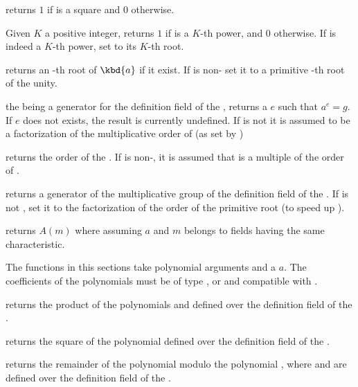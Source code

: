  returns $1$ if  is a square and $0$
otherwise.

 Given $K$ a positive integer,
returns $1$ if  is a $K$-th power, and $0$ otherwise. If  is
indeed a $K$-th power, set  to its $K$-th root.

 returns an -th root of
$\kbd{a}$ if it exist. If  is non- set it to a primitive
-th root of the unity.

 the   being a
generator for the definition field of the  , returns a
 $e$ such that $a^e=g$.  If $e$ does not exists, the result is
currently undefined. If  is not  it is assumed to be a
factorization of the multiplicative order of  (as set by
)

 returns the order of the  .
If  is non-, it is assumed that  is a multiple of the
order of .

 returns a generator of the
multiplicative group of the definition field of the  .
If  is not , set it to the factorization of the order
of the primitive root (to speed up ).

 returns $A(m)$ where  assuming
$a$ and $m$ belongs to fields having the same characteristic.


The functions in this sections take polynomial arguments and a 
$a$. The coefficients of the polynomials must be of type ,
 or  and compatible with .

 returns the product of the polynomials
 and  defined over the definition field of the 
.

 returns the square of the polynomial
 defined over the definition field of the  .

 returns the remainder
of the polynomial  modulo the polynomial , where  and
 are defined over the definition field of the  .

